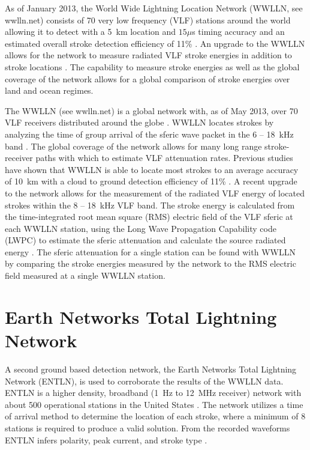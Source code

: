 As of January 2013, the World Wide Lightning Location Network (WWLLN, see wwlln.net) consists of 70 very low frequency (VLF) stations around the world allowing it to detect with a 5~km location and $15\mu$s timing accuracy and an estimated overall stroke detection efficiency of 11\% \citep{Hutchins2012a, Abarca2010,Rodger2009}.
An upgrade to the WWLLN allows for the network to measure radiated VLF stroke energies in addition to stroke locations \citep{Hutchins2012}.
The capability to measure stroke energies as well as the global coverage of the network allows for a global comparison of stroke energies over land and ocean regimes.

The WWLLN (see wwlln.net) is a global network with, as of May 2013, over 70 VLF receivers distributed around the globe \citep{Rodger2006, Rodger2009}.
WWLLN locates strokes by analyzing the time of group arrival of the sferic wave packet in the 6 -- 18~kHz band \citep{Dowden2000}.
The global coverage of the network allows for many long range stroke-receiver paths with which to estimate VLF attenuation rates.
Previous studies have shown that WWLLN is able to locate most strokes to an average accuracy of 10~km with a cloud to ground detection efficiency of 11\% \citep{Abarca2010, Rodger2009}.
A recent upgrade to the network allows for the measurement of the radiated VLF energy of located strokes within the 8 -- 18~kHz VLF band.
The stroke energy is calculated from the time-integrated root mean square (RMS) electric field of the VLF sferic at each WWLLN station, using the Long Wave Propagation Capability code (LWPC) \citep{Ferguson1998} to estimate the sferic attenuation and calculate the source radiated energy \citep{Hutchins2012}.
The sferic attenuation for a single station can be found with WWLLN by comparing the stroke energies measured by the network to the RMS electric field measured at a single WWLLN station.

\section{Earth Networks Total Lightning Network}

A second ground based detection network, the Earth Networks Total Lightning Network (ENTLN), is used to corroborate the results of the WWLLN data.
ENTLN is a higher density, broadband (1~Hz to 12~MHz receiver) network with about 500 operational stations in the United States \citep{Heckman2010}.
The network utilizes a time of arrival method to determine the location of each stroke, where a minimum of 8 stations is required to produce a valid solution.
From the recorded waveforms ENTLN infers polarity, peak current, and stroke type \citep{Liu2011a}.

